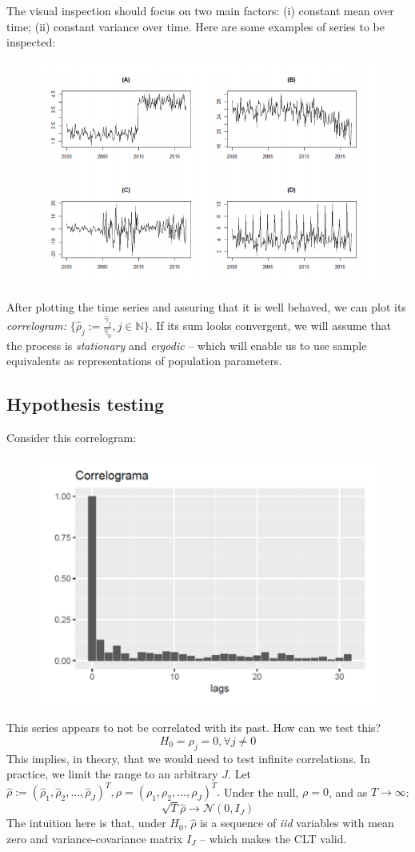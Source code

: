 \documentclass[11pt, a4paper]{report}
\theoremstyle{plain}
\theoremstyle{plain}
\theoremstyle{remark}
\begin{document}
The visual inspection should focus on two main factors: (i) constant mean over time; (ii) constant variance over time. Here are some examples of series to be inspected:

\begin{figure}[h!]
	\centering
	\includegraphics[width=0.6\linewidth]{"exemplos ts"}
	\label{fig:exemplos-ts}
\end{figure}

After plotting the time series and assuring that it is well behaved, we can plot its \textit{correlogram:} $\{ \hat{\rho}_{j} := \frac{\hat{\gamma}_{j}}{\hat{\gamma}_{0}}, j \in \mathbb{N}\}$. If its sum looks convergent, we will assume that the process is \textit{stationary} and \textit{ergodic} -- which will enable us to use sample equivalents as representations of population parameters.

\subsection{Hypothesis testing}

Consider this correlogram:

\begin{figure}
	\centering
	\includegraphics[width=0.6\linewidth]{"correlograma rx"}
	\label{fig:correlograma-rx}
\end{figure}

This series appears to not be correlated with its past. How can we test this? 
$$ H_0 = \rho_j = 0, \forall j \neq 0 $$
This implies, in theory, that we would need to test infinite correlations. In practice, we limit the range to an arbitrary $J$. Let $\hat{\rho} := (\hat{\rho}_1, \hat{\rho}_2, ..., \hat{\rho}_J)^T, \rho = (\rho_1, \rho_2, ..., \rho_J)^T.$ Under the null, $\rho = 0$, and as $T \to \infty$:
$$ \sqrt{T}\hat{\rho} \to \mathcal{N}(0, I_J) $$
The intuition here is that, under $H_0$, $\hat{\rho}$ is a sequence of \textit{iid} variables with mean zero and variance-covariance matrix $I_J$ -- which makes the CLT valid. 
\end{document}
